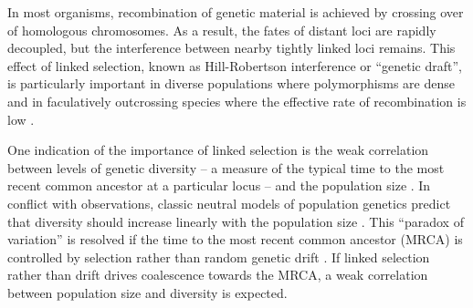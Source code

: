 In most organisms, recombination of genetic material is achieved by
crossing over of homologous chromosomes. As a result, the fates of distant loci are
rapidly decoupled, but the interference between
nearby tightly linked loci remains. This effect of linked selection, known as
Hill-Robertson interference \cite{Hill:1966p21029} or
``genetic draft'', is particularly important in diverse populations
where polymorphisms are dense \cite{cutter_molecular_2013} and in
faculatively outcrossing species where the effective rate of recombination is
low
\cite{bomblies_local-scale_2010,tsai_population_2008,barriere_high_2005}.

One indication of the importance of linked selection is
the weak correlation between levels of genetic diversity -- a measure of
the typical time to the most recent common ancestor at a particular
locus -- and the population size
\cite{leffler_revisiting_2012,Lewontin1974}. In conflict with
observations, classic neutral models of population genetics predict that
diversity should increase linearly with the population size
\cite{Kingman:1982p28911,Kimura:1964p3388}.  This ``paradox of
variation'' is resolved if the time to the most recent common ancestor
(MRCA) is controlled by selection rather than random genetic drift
\cite{Smith:1974p34217,Gillespie:2001p9636}. 
If linked selection
rather than drift drives coalescence towards the MRCA, a weak
correlation between population size and diversity is expected.



